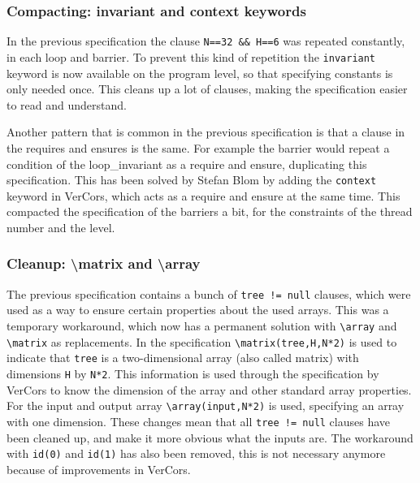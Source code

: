 \documentclass[a4paper]{article}
\newcommand{\code}[1]{\texttt{\small \color{inline}#1}} %
\begin{document}
\subsubsection{Compacting: invariant and context keywords}
In the previous specification the clause \code{N==32 \&\& H==6} was repeated constantly, in each loop and barrier. To prevent this kind of repetition the \code{invariant} keyword is now available on the program level, so that specifying constants is only needed once. This cleans up a lot of clauses, making the specification easier to read and understand.

Another pattern that is common in the previous specification is that a clause in the requires and ensures is the same. For example the barrier would repeat a condition of the loop\_invariant as a require and ensure, duplicating this specification. This has been solved by Stefan Blom by adding the \code{context} keyword in VerCors, which acts as a require and ensure at the same time. This compacted the specification of the barriers a bit, for the constraints of the thread number and the level.

\subsubsection{Cleanup: \textbackslash matrix and \textbackslash array}
The previous specification contains a bunch of \code{tree != null} clauses, which were used as a way to ensure certain properties about the used arrays. This was a temporary workaround, which now has a permanent solution with \code{\textbackslash array} and \code{\textbackslash matrix} as replacements. In the specification \code{\textbackslash matrix(tree,H,N*2)} is used to indicate that \code{tree} is a two-dimensional array (also called matrix) with dimensions \code{H} by \code{N*2}. This information is used through the specification by VerCors to know the dimension of the array and other standard array properties. For the input and output array \code{\textbackslash array(input,N*2)} is used, specifying an array with one dimension. These changes mean that all \code{tree != null} clauses have been cleaned up, and make it more obvious what the inputs are. The workaround with \code{id(0)} and \code{id(1)} has also been removed, this is not necessary anymore because of improvements in VerCors.


\end{document}

